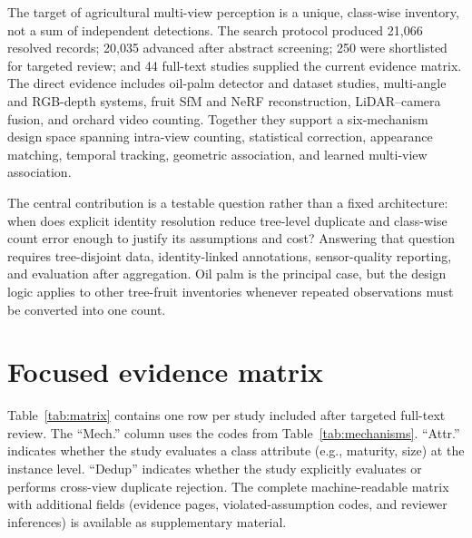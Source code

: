 The target of agricultural multi-view perception is a unique, class-wise inventory, not a sum of independent detections. The search protocol produced 21,066 resolved records; 20,035 advanced after abstract screening; 250 were shortlisted for targeted review; and 44 full-text studies supplied the current evidence matrix. The direct evidence includes oil-palm detector and dataset studies, multi-angle and RGB-depth systems, fruit SfM and NeRF reconstruction, LiDAR--camera fusion, and orchard video counting. Together they support a six-mechanism design space spanning intra-view counting, statistical correction, appearance matching, temporal tracking, geometric association, and learned multi-view association.

The central contribution is a testable question rather than a fixed architecture: when does explicit identity resolution reduce tree-level duplicate and class-wise count error enough to justify its assumptions and cost? Answering that question requires tree-disjoint data, identity-linked annotations, sensor-quality reporting, and evaluation after aggregation. Oil palm is the principal case, but the design logic applies to other tree-fruit inventories whenever repeated observations must be converted into one count.


\appendix

\section{Focused evidence matrix}
\label{app:matrix}

Table~\ref{tab:matrix} contains one row per study included after targeted full-text review. The ``Mech.'' column uses the codes from Table~\ref{tab:mechanisms}. ``Attr.'' indicates whether the study evaluates a class attribute (e.g., maturity, size) at the instance level. ``Dedup'' indicates whether the study explicitly evaluates or performs cross-view duplicate rejection. The complete machine-readable matrix with additional fields (evidence pages, violated-assumption codes, and reviewer inferences) is available as supplementary material.

\makeatletter
{}
\makeatother

